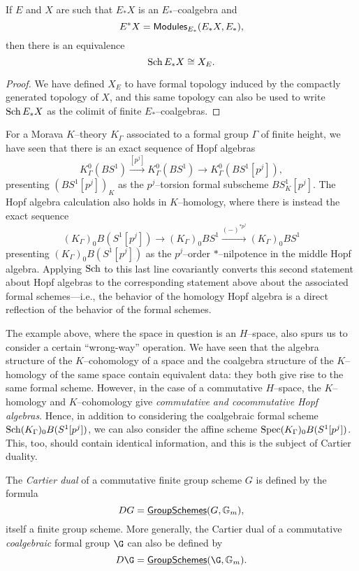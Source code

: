 \begin{lemma}
If $E$ and $X$ are such that $E_* X$ is an $E_*$--coalgebra and \[E^* X = \mathsf{Modules}_{E_*}(E_* X, E_*),\] then there is an equivalence \[\operatorname{Sch} E_* X \cong X_E.\]
\end{lemma}
\begin{proof}
We have defined $X_E$ to have formal topology induced by the compactly generated topology of $X$, and this same topology can also be used to write $\operatorname{Sch} E_* X$ as the colimit of finite $E_*$--coalgebras.
\end{proof}

\begin{example}
For a Morava $K$--theory $K_\Gamma$ associated to a formal group $\Gamma$ of finite height, we have seen that there is an exact sequence of Hopf algebras \[K_\Gamma^0(BS^1) \xrightarrow{[p^j]} K_\Gamma^0(BS^1) \to K_\Gamma^0(BS^1[p^j]),\] presenting $(BS^1[p^j])_K$ as the $p^j$--torsion formal subscheme $BS^1_K[p^j]$.  The Hopf algebra calculation also holds in $K$--homology, where there is instead the exact sequence \[(K_\Gamma)_0 B(S^1[p^j]) \to (K_\Gamma)_0 BS^1 \xrightarrow{(-)^{\ast p^j}} (K_\Gamma)_0 BS^1\] presenting $(K_\Gamma)_0 B(S^1[p^j])$ as the $p^j$--order $\ast$--nilpotence in the middle Hopf algebra.  Applying $\operatorname{Sch}$ to this last line covariantly converts this second statement about Hopf algebras to the corresponding statement above about the associated formal schemes---i.e., the behavior of the homology Hopf algebra is a direct reflection of the behavior of the formal schemes.
\end{example}

The example above, where the space in question is an $H$--space, also spurs us to consider a certain ``wrong-way'' operation.  We have seen that the algebra structure of the $K$--cohomology of a space and the coalgebra structure of the $K$--homology of the same space contain equivalent data: they both give rise to the same formal scheme.  However, in the case of a commutative $H$--space, the $K$--homology and $K$--cohomology give \emph{commutative and cocommutative Hopf algebras}.  Hence, in addition to considering the coalgebraic formal scheme $\operatorname{Sch} (K_\Gamma)_0 B(S^1[p^j])$, we can also consider the affine scheme $\operatorname{Spec} (K_\Gamma)_0 B(S^1[p^j])$.  This, too, should contain identical information, and this is the subject of Cartier duality.

\begin{definition}\label{DefnCartierDual}
The \textit{Cartier dual} of a commutative finite group scheme $G$ is defined by the formula \[DG = \operatorname{\underline{\smash{\mathsf{GroupSchemes}}}}(G, \mathbb G_m),\] itself a finite group scheme.  More generally, the Cartier dual of a commutative \emph{coalgebraic} formal group $\G$ can also be defined by \[D\G = \InternalHom{GroupSchemes}(\G, \Gm).\]
\end{definition}


